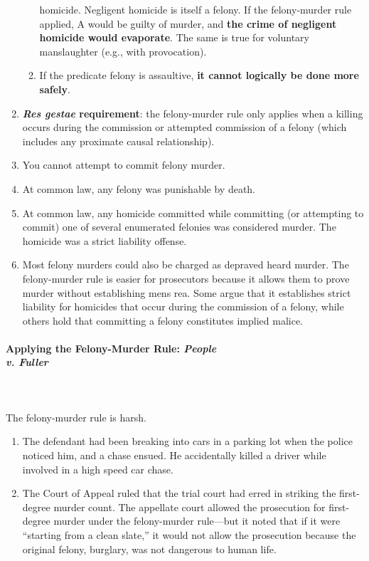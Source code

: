 \begin{enumerate}
\begin{enumerate}
        homicide. Negligent homicide is itself a felony. If the felony-murder 
        rule applied, A would be guilty of murder, and \textbf{the crime of 
        negligent homicide would evaporate}. The same is true for voluntary 
        manslaughter (e.g., with provocation).
        \item If the predicate felony is assaultive, \textbf{it cannot 
        logically be done more safely}.
    \end{enumerate}
    \item \textbf{\emph{Res gestae} requirement}: the felony-murder rule only 
    applies when a killing occurs during the commission or attempted 
    commission of a felony (which includes any proximate causal relationship).
    \item You cannot attempt to commit felony murder. %
    \item At common law, any felony was punishable by death.
    \item At common law, any homicide committed while committing (or 
    attempting to commit) one of several enumerated felonies was considered 
    murder. The homicide was a strict liability offense.
    \item Most felony murders could also be charged as depraved heard murder. 
    The felony-murder rule is easier for prosecutors because it allows them to 
    prove murder without establishing mens rea. Some argue that it establishes 
    strict liability for homicides that occur during the commission of a 
    felony, while others hold that committing a felony constitutes implied 
    malice.
\end{enumerate}

\paragraph{Applying the Felony-Murder Rule: \emph{People\\v. Fuller}} 
~\\\\
The felony-murder rule is harsh.

\begin{enumerate}
    \item The defendant had been breaking into cars in a parking lot when the 
    police noticed him, and a chase ensued. He accidentally killed a driver 
    while involved in a high speed car chase.
    \item The Court of Appeal ruled that the trial court had erred in striking 
    the first-degree murder count. The appellate court allowed the prosecution 
    for first-degree murder under the felony-murder rule---but it noted that 
    if it were ``starting from a clean slate,'' it would not allow the 
    prosecution because the original felony, burglary, was not dangerous to 
    human life.
\end{enumerate}

